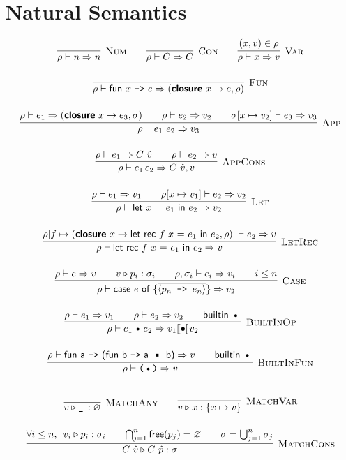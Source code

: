 \documentclass{article}
\def\code#1{\textsf{#1}}
\def\rt{\Rightarrow}
\def\binop{\, \text{\textbullet}\, }
\def\envj#1#2#3{#1 \vdash #2 \rt #3}
\def\closure#1#2#3{(\textsf{\textbf{closure}} \ #1 \to #2,#3)}
\def\tsc#1{\textsc{#1}}
\def\matchj#1#2#3{#1 \triangleright #2 : #3}
\begin{document}
\section*{Natural Semantics}

\begin{gather*}
\infer[\tsc{Num}]{\envj \rho n n}{}\qquad
\infer[\tsc{Con}]{\envj \rho C C}{}\qquad
\infer[\tsc{Var}]{\envj \rho x v}{(x,v)\in \rho}\\[12pt]
\infer[\tsc{Fun}]{\envj \rho {\code{fun $x$ \texttt{->} $e$}} {\closure x e \rho}}{}\\[12pt]
\infer[\tsc{App}]{\envj \rho {e_1 \ e_2} v_3}{\envj{\rho}{e_1}{\closure x {e_3} {\sigma}} && \envj \rho {e_2} {v_2} && \envj{\sigma [x\mapsto v_2]}{e_3}{v_3}}\\[12pt]
\infer[\tsc{AppCons}]{\envj{\rho}{e_1\, e_2}{C\ \hat{v},v}}{\envj{\rho}{e_1}{C\ \hat{v}} && \envj{\rho}{e_2}{v}}\\[12pt]
\infer[\tsc{Let}]{\envj \rho {\code{let $x$ = $e_1$ in $e_2$}} {v_2}}{\envj \rho {e_1} {v_1} && \envj {\rho[x\mapsto v_1]} {e_2} {v_2}}\\[12pt]
\infer[\tsc{LetRec}]{\envj \rho {\code{let rec $f$ $x$ = $e_1$ in $e_2$}} {v}}{\envj{\rho[f \mapsto \closure x {\code{let rec $f$ $x$ = $e_1$ in $e_2$}}{\rho}]}{e_2}{v}}\\[12pt]
\infer[\tsc{Case}]{\envj \rho {\code{case $e$ of \{$\overline{\langle p_n \texttt{ -> } e_n\rangle}$\}}} {v_2}}{\envj \rho {e} {v} && v\triangleright p_i : \sigma_i && \envj {\rho,\sigma_i}{e_i}{v_i} && i \leq n}\\[12pt]
\infer[\tsc{BuiltInOp}]{\envj \rho {e_1 \binop e_2} {v_1\llbracket\bullet \rrbracket v_2}}{\envj \rho {e_1} {v_1} && \envj {\rho} {e_2} {v_2} && \textsf{builtin}\, \binop}\\[12pt]
\infer[\tsc{BuiltInFun}]{\envj \rho {\texttt{($\binop$)}} {v}}{\envj \rho {\code{fun a \texttt{->} (fun b \texttt{->} a $\binop$ b)}} {v} && \textsf{builtin}\, \binop}\\[12pt]
\end{gather*}

\begin{gather*}
\infer[\tsc{MatchAny}]{\matchj v {\texttt{\_}\,} \varnothing}{}\qquad
\infer[\tsc{MatchVar}]{\matchj v x {\{x\mapsto v\}}}{}\\[12pt]
\infer[\tsc{MatchCons}]{\matchj {C\ \hat{v}} {C\ \hat{p}} \sigma}{\forall i \leq n,\ \, \matchj{v_i}{p_i}{\sigma_i} && \bigcap_{j=1}^n \textsf{free}(p_j)=\varnothing && \sigma = \bigcup_{j=1}^n \sigma_j}	
\end{gather*}
\end{document}
